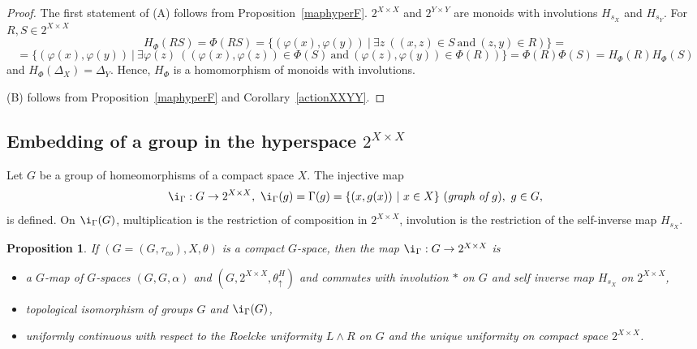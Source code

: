 \documentclass{amsart}
\newtheorem{pro}[thm]{Proposition}
\begin{document}
\begin{proof}
The first statement of (A) follows from  Proposition~\ref{maphyperF}. $2^{X\times X}$ and $2^{Y\times Y}$ are monoids with involutions $H_{s_X}$ and $H_{s_Y}$. For $R, S\in 2^{X\times X}$ 
$$H_{\Phi} (RS)=\Phi (RS)=\{(\varphi (x), \varphi (y))\ |\ \exists z\ ((x,z)\in S\ \mbox{and}\ (z,y)\in R)\}=$$
$$=\{(\varphi (x), \varphi (y))\ |\ \exists \varphi (z)\ ((\varphi (x), \varphi (z))\in\Phi (S)\ \mbox{and}\ (\varphi (z), \varphi (y))\in\Phi (R))\}=\Phi (R)\Phi (S)=H_{\Phi}(R)H_{\Phi}(S)$$
and $H_{\Phi}(\Delta_X)=\Delta_Y$. Hence, $H_{\Phi}$ is a homomorphism of monoids with involutions.

(B) follows from Proposition~\ref{maphyperF} and Corollary~\ref{actionXXYY}. 
\end{proof}


\subsection{Embedding of a group in the hyperspace $2^{X\times X}$} 

Let $G$ be a group of homeomorphisms of a compact space $X$. The injective map 
$$\i_{\Gamma}: G\to 2^{X\times X},\ \i_{\Gamma}(g)=\Gamma (g)=\{(x, g(x))\ |\ x\in X\}\ (\mbox{\it graph of}\ g),\ g\in G,$$ 
is defined. On $\i_{\Gamma}(G)$, multiplication is the restriction of composition in $2^{X\times X}$, involution is the restriction of the self-inverse map $H_{s_X}$.  

\begin{pro}\label{homomF}
If $(G=(G, \tau_{co}), X, \theta)$ is a compact $G$-space, then the map $\i_{\Gamma}: G\to 2^{X\times X}$ is
\begin{itemize}
\item[(a)]  a $G$-map of $G$-spaces $(G, G, \alpha)$ and $(G, 2^{X\times X}, \theta^H_{\uparrow})$ and commutes with involution $*$ on $G$ and self inverse map $H_{s_X}$ on $2^{X\times X}$,
\item[(b)] topological isomorphism of groups $G$ and $\i_{\Gamma}(G)$,
\item[(c)] uniformly continuous with respect to the Roelcke uniformity $L\wedge R$ on $G$ and the unique uniformity on compact space $2^{X\times X}$.
\end{itemize}
\end{pro}
\end{document}

